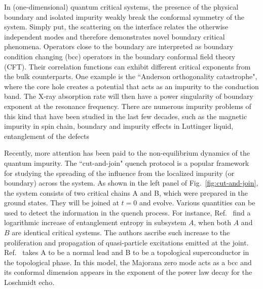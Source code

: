 

In (one-dimensional) quantum critical systems, the presence of the physical boundary and isolated impurity weakly break the conformal symmetry of the system. Simply put, the scattering on the interface relates the otherwise independent modes and therefore demonstrates novel boundary critical phenomena\cite{cardy_boundary_2004}. Operators close to the boundary are interpreted as boundary condition changing (bcc) operators\cite{oshikawa_boundary_1997,affleck_boundary_1997} in the boundary conformal field theory (CFT). Their correlation functions can exhibit different critical exponents from the bulk counterparts\cite{cardy_conformal_1984}. One example is the ``Anderson orthogonality catastrophe", where the core hole creates a potential that acts as an impurity to the conduction band. The X-ray absorption rate will then have a power singularity of boundary exponent\cite{affleck_boundary_1997} at the resonance frequency. There are numerous impurity problems of this kind that have been studied in the last few decades, such as the magnetic impurity in spin chain\cite{eggert_magnetic_1992}, boundary and impurity effects in Luttinger liquid\cite{fabrizio_interacting_1995}, entanglement of the defects\cite{peschel_entanglement_2005, igloi_entanglement_2009,calabrese_entanglement_2012} \etc

Recently, more attention has been paid to the non-equilibrium dynamics of the quantum impurity\cite{hegde_quench_2015,francica_local_2016,lupo_transient_2016,lee_spatiotemporal_2016,chung_memory_2016,sacramento_edge_2016,vasseur_expansion_2015,mazza_overlap_2016}. The ``cut-and-join" quench protocol is a popular framework for studying the spreading of the influence from the localized impurity (or boundary) across the system. As shown in the left panel of Fig.~\ref{fig:cut-and-join}, the system consists of two critical chains A and B, which were prepared in the ground states. They will be joined at $t = 0$ and evolve. Various quantities can be used to detect the information in the quench process. For instance, Ref.~ find a logarithmic increase of entanglement entropy in subsystem $A$, when both $A$ and $B$ are identical critical systems. The authors ascribe such increase to the proliferation and propagation of quasi-particle excitations emitted at the joint. Ref.~ takes A to be a normal lead and B to be a topological superconductor in the topological phase. In this model, the Majorana zero mode acts as a bcc and its conformal dimension appears in the exponent of the power law decay for the Loschmidt echo.

